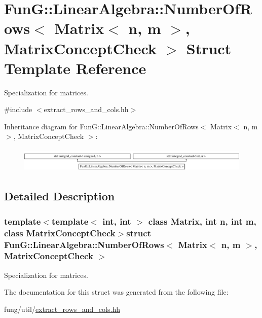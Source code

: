 \hypertarget{structFunG_1_1LinearAlgebra_1_1NumberOfRows_3_01Matrix_3_01n_00_01m_01_4_00_01MatrixConceptCheck_01_4}{\section{\-Fun\-G\-:\-:\-Linear\-Algebra\-:\-:\-Number\-Of\-Rows$<$ \-Matrix$<$ n, m $>$, \-Matrix\-Concept\-Check $>$ \-Struct \-Template \-Reference}
\label{structFunG_1_1LinearAlgebra_1_1NumberOfRows_3_01Matrix_3_01n_00_01m_01_4_00_01MatrixConceptCheck_01_4}
}


\-Specialization for matrices.  




{\ttfamily \#include $<$extract\-\_\-rows\-\_\-and\-\_\-cols.\-hh$>$}

\-Inheritance diagram for \-Fun\-G\-:\-:\-Linear\-Algebra\-:\-:\-Number\-Of\-Rows$<$ \-Matrix$<$ n, m $>$, \-Matrix\-Concept\-Check $>$\-:\begin{figure}[H]
\begin{center}
\leavevmode
\includegraphics[height=1.199143cm]{structFunG_1_1LinearAlgebra_1_1NumberOfRows_3_01Matrix_3_01n_00_01m_01_4_00_01MatrixConceptCheck_01_4}
\end{center}
\end{figure}


\subsection{\-Detailed \-Description}
\subsubsection*{template$<$template$<$ int, int $>$ class \-Matrix, int n, int m, class Matrix\-Concept\-Check$>$struct Fun\-G\-::\-Linear\-Algebra\-::\-Number\-Of\-Rows$<$ Matrix$<$ n, m $>$, Matrix\-Concept\-Check $>$}

\-Specialization for matrices. 

\-The documentation for this struct was generated from the following file\-:\begin{DoxyCompactItemize}
\item 
fung/util/\hyperlink{extract__rows__and__cols_8hh}{extract\-\_\-rows\-\_\-and\-\_\-cols.\-hh}\end{DoxyCompactItemize}
